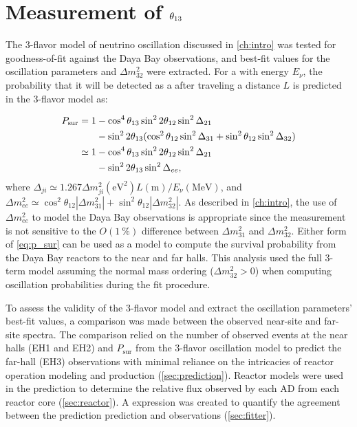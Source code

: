 \chapter{Measurement of \texorpdfstring{$\theta_{13}$}{theta13}}
\label{ch:analysis}

The 3-flavor model of neutrino oscillation discussed in \cref{ch:intro}
was tested for goodness-of-fit against the Daya Bay observations,
and best-fit values for the oscillation parameters \thetaot{} and $\Delta m^2_{32}${}
were extracted.
For a \nuebar{} with energy $E_\nu$,
the probability that it will be detected as a \nuebar{}
after traveling a distance $L$ is predicted in the 3-flavor model as:

\begin{align}\label{eq:p_sur}
    \begin{split}
        P_\text{sur} = 1 &- \cos^4\theta_{13}\sin^22\theta_{12}\sin^2\Delta_{21} \\
                         &- \sin^22\theta_{13}(\cos^2\theta_{12}\sin^2\Delta_{31}
                     + \sin^2\theta_{12}\sin^2\Delta_{32}) \\
        \simeq 1 &- \cos^4\theta_{13}\sin^22\theta_{12}\sin^2\Delta_{21} \\
                 &- \sin^22\theta_{13}\sin^2\Delta_{ee},
\end{split}
\end{align}
where
$\Delta_{ji} \simeq 1.267 \Delta m^2_{ji} (\si{\eV}^2) L(\si{\m})/E_\nu (\si{\MeV})$,
and
$\Delta m^2_{ee} \simeq \cos^2\theta_{12}\left|\Delta m^2_{31}\right| +
\sin^2\theta_{12}\left|\Delta m^2_{32}\right|$.
As described in \cref{ch:intro},
the use of $\Delta m^2_{ee}$ to model the Daya Bay observations
is appropriate since the measurement is not sensitive
to the $O(\SI{1}{\percent})$ difference between $\Delta m^2_{31}$ and $\Delta m^2_{32}$.
Either form of \cref{eq:p_sur} can be used as a model
to compute the \nuebar{} survival probability
from the Daya Bay reactors to the near and far halls.
This analysis used the full 3-term model
assuming the normal mass ordering ($\Delta m^2_{32} > 0$)
when computing oscillation probabilities during the fit procedure.

To assess the validity of the 3-flavor model and extract the oscillation parameters'
best-fit values,
a comparison was made between the observed near-site and far-site \nuebar{} spectra.
The comparison relied on the number of observed events at the near halls (EH1 and EH2)
and $P_\text{sur}$ from the 3-flavor oscillation model
to predict the far-hall (EH3) observations
with minimal reliance on the intricacies of reactor operation modeling
and \nuebar{} production (\cref{sec:prediction}).
Reactor \nuebar{} models were used in the prediction
to determine the relative \nuebar{} flux
observed by each AD from each reactor core (\cref{sec:reactor}).
A \chisquare{} expression was created to quantify the agreement
between the prediction prediction and observations (\cref{sec:fitter}).

